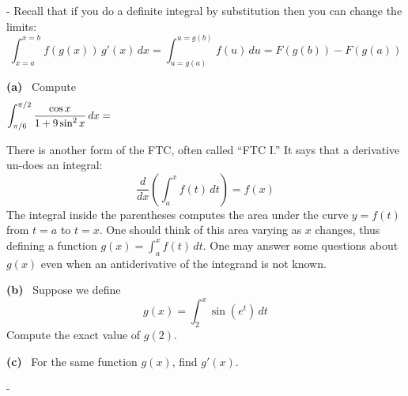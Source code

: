 \documentclass[12pt]{article}
\makeatletter
\newcounter{probcount}
\newcounter{subprobcount}
\newlength\probsep
\newlength\pshrinking
\newif\iffirstprob
\newenvironment{aproblems}%
  {\ifhmode\unskip\par\fi\setcounter{probcount}{0}\probsep\parskip
  \sbox\@tempboxa{\textbf{9.}}\pshrinking\wd\@tempboxa\advance\pshrinking\labelsep
  \let\hproblem\aproblem
  \advance\linewidth -\pshrinking
  \advance\@totalleftmargin\pshrinking
  \advance\leftskip\pshrinking}%
  {\ifhmode\unskip \par\fi\advance\leftskip-\pshrinking}%
\newcommand{\aproblem}{%
  \setcounter{subprobcount}{0}%
  \stepcounter{probcount}%
  \def\@currentlabel{\arabic{probcount}}%
  \ifhmode
    \unskip \par
  \fi
  \iffirstprob\else\addvspace\probsep\fi
  \firstprobfalse
  \hskip -\labelwidth\hskip -\labelsep 
  \hbox to\labelwidth{\hss\textbf{\arabic{probcount}.}}\hskip\labelsep
}%
\newcommand{\epart}[1]{\noindent \textbf{(#1)} \,}
\makeatother
\begin{document}
\begin{aproblems}
Recall that if you do a definite integral by substitution then you can change the limits:
    $$\int_{x=a}^{x=b} f(g(x))\,g'(x)\,dx = \int_{u=g(a)}^{u=g(b)} f(u)\,du = F(g(b)) - F(g(a))$$

\epart{a}  Compute
    $$\int_{\pi/6}^{\pi/2} \frac{\cos x}{1 + 9 \sin^2 x}\,dx = \phantom{\int_{3/2}^3 \frac{du/3}{1+u^2} =} \hspace{3.0in}$$

\vspace{0.5in}

There is another form of the FTC, often called ``FTC I.''  It says that a derivative un-does an integral:
    $$\frac{d}{dx} \left(\int_a^x f(t)\,dt\right) = f(x)$$
The integral inside the parentheses computes the area under the curve $y=f(t)$ from $t=a$ to $t=x$.  One should think of this area varying as $x$ changes, thus defining a function $g(x) = \int_a^x f(t)\,dt$.  One may answer some questions about $g(x)$ even when an antiderivative of the integrand is not known.

\epart{b}  Suppose we define
    $$g(x) = \int_2^x \sin(e^t)\,dt$$
Compute the exact value of $g(2)$.

\vspace{0.25in}

\epart{c}  For the same function $g(x)$, find $g'(x)$.

\vfill

\end{aproblems}
\end{document}
